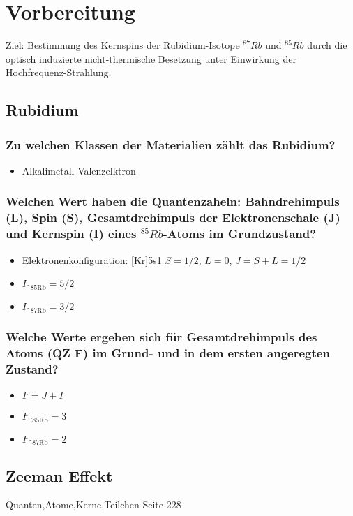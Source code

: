 \section{Vorbereitung}
Ziel: Bestimmung des Kernspins der Rubidium-Isotope $^{87}Rb$ und $^{85}Rb$ durch die optisch induzierte nicht-thermische Besetzung unter
Einwirkung der Hochfrequenz-Strahlung. 

\subsection{Rubidium}
\subsubsection[]{Zu welchen Klassen der Materialien zählt das Rubidium?}
\begin{itemize}
    \item Alkalimetall
     Valenzelktron
\end{itemize}
\subsubsection[]{Welchen Wert haben die Quantenzaheln: Bahndrehimpuls (L), Spin (S), Gesamtdrehimpuls der Elektronenschale (J) und Kernspin (I) eines $^{85}Rb$-Atoms im Grundzustand?}
\begin{itemize}
    \item Elektronenkonfiguration: [Kr]5s1
    \to $S=1/2$, $L=0$, $J=S+L=1/2$
    \item $I_\text{^{85}Rb}=5/2$
    \item $I_\text{^{87}Rb}=3/2$
\end{itemize}
\subsubsection[]{Welche Werte ergeben sich für Gesamtdrehimpuls des Atoms (QZ F) im Grund- und in dem ersten angeregten Zustand?}
\begin{itemize}
    \item $F=J+I$
    \item $F_\text{^{85}Rb}=3$
    \item $F_\text{^{87}Rb}=2$
\end{itemize}

\subsection{Zeeman Effekt}
Quanten,Atome,Kerne,Teilchen Seite 228

